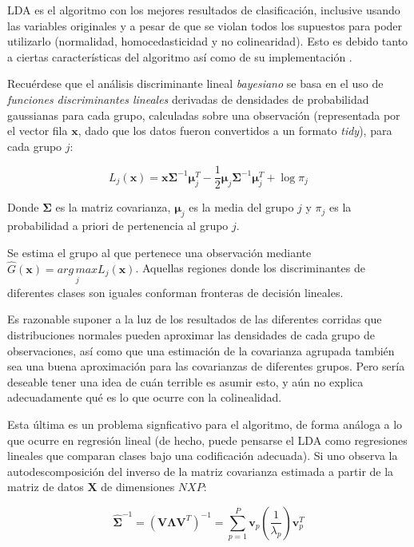 \documentclass[12pt]{article}
\begin{document}
LDA es el algoritmo con los mejores resultados de clasificación, inclusive usando las variables originales y a pesar de que se violan todos los supuestos para poder utilizarlo (normalidad, homocedasticidad y no colinearidad). Esto es debido tanto a ciertas características del algoritmo así como de su implementación \cite{DA}.

Recuérdese que el análisis discriminante lineal \textit{bayesiano} se basa en el uso de \textit{funciones discriminantes lineales} derivadas de densidades de probabilidad gaussianas para cada grupo, calculadas sobre una observación (representada por el vector fila $\mathbf{x}$, dado que los datos fueron convertidos a un formato \textit{tidy}), para cada grupo $j$:

\begin{equation} \label{eq:lineal_discriminant}
L_j (\mathbf{x}) = \mathbf{x} \boldsymbol{\Sigma}^{-1} \boldsymbol{\mu}_j^T - \frac{1}{2} \boldsymbol{\mu}_j \boldsymbol{\Sigma}^{-1} \boldsymbol{\mu}_j^T + \log \pi_j
\end{equation}

Donde $\boldsymbol{\Sigma}$ es la matriz covarianza, $\boldsymbol{\mu}_j$ es la media del grupo $j$ y $\pi_j$ es la probabilidad a priori de pertenencia al grupo $j$.  

Se estima el grupo al que pertenece una observación mediante $\hat{G}(\mathbf{x}) = \underset{j}{arg\,max} L_j (\mathbf{x})$. Aquellas regiones donde los discriminantes de diferentes clases son iguales conforman fronteras de decisión lineales.

Es razonable suponer a la luz de los resultados de las diferentes corridas que distribuciones normales pueden aproximar las densidades de cada grupo de observaciones, así como que una estimación de la covarianza agrupada también sea una buena aproximación para las covarianzas de diferentes grupos. Pero sería deseable tener una idea de cuán terrible es asumir esto, y aún no explica adecuadamente qué es lo que ocurre con la colinealidad.

Esta última es un problema signficativo para el algoritmo\cite{NAES2001}, de forma análoga a lo que ocurre en regresión lineal (de hecho, puede pensarse el LDA como regresiones lineales que comparan clases bajo una codificación adecuada\cite{ESL2008}). Si uno observa la autodescomposición del inverso de la matriz covarianza estimada a partir de la matriz de datos $\mathbf{X}$ de dimensiones $NXP$:

\begin{equation} \label{eq:eigendecomposition}
\hat{\boldsymbol{\Sigma}}^{-1} = (\mathbf{V} \boldsymbol{\Lambda} \mathbf{V}^T)^{-1} = \sum_{p = 1}^{P} \mathbf{v}_p (\frac{1}{\lambda_p}) \mathbf{v}_p^T 
\end{equation}
\end{document}
